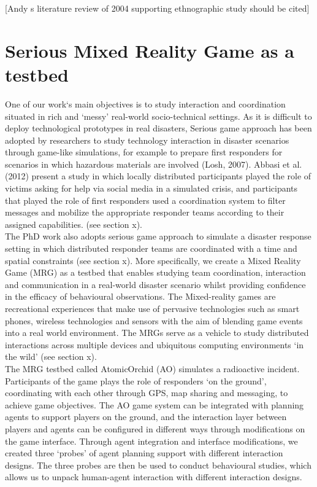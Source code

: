 [Andy s literature review of 2004 supporting ethnographic study should be cited]\\


\section{Serious Mixed Reality Game as a testbed}
One of our work`s main objectives is to study interaction and coordination situated in rich and `messy' real-world socio-technical settings. As it is difficult to deploy technological prototypes in real disasters, Serious game approach has been adopted by researchers to study technology interaction in disaster scenarios through game-like simulations, for example to prepare first responders for scenarios in which hazardous materials are involved (Losh, 2007). Abbasi et al. (2012) present a study in which locally distributed participants played the role of victims asking for help via social media in a simulated crisis, and participants that played the role of first responders used a coordination system to filter messages and mobilize the appropriate responder teams according to their assigned capabilities. (see section x).\\

The PhD work also adopts serious game approach to simulate a disaster response setting in which distributed responder teams are coordinated with a time and spatial constraints (see section x). More specifically, we create a Mixed Reality Game (MRG) as a testbed that enables studying team coordination, interaction and communication in a real-world disaster scenario whilst providing confidence in the efficacy of behavioural observations. The Mixed-reality games are recreational experiences that make use of pervasive technologies such as smart phones, wireless technologies and sensors with the aim of blending game events into a real world environment. The MRGs serve as a vehicle to study distributed interactions across multiple devices and ubiquitous computing environments `in the wild' (see section x).\\

The MRG testbed called AtomicOrchid (AO) simulates a radioactive incident. Participants of the game plays the role of responders `on the ground', coordinating with each other through GPS, map sharing and messaging, to achieve game objectives. The AO game system can be integrated with planning agents to support players on the ground, and the interaction layer between players and agents can be configured in different ways through modifications on the game interface. Through agent integration and interface modifications, we created three `probes' of agent planning support with different interaction designs. The three probes are then be used to conduct behavioural studies, which allows us to unpack human-agent interaction with different interaction designs.\\

